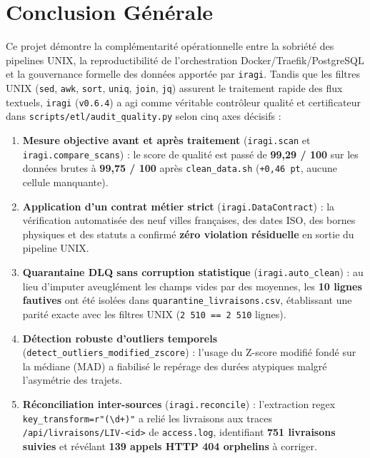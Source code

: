 \documentclass[11pt,a4paper]{article}
\begin{document}
\section{Conclusion G\'en\'erale}
Ce projet d\'emontre la compl\'ementarit\'e op\'erationnelle entre la sobri\'et\'e des pipelines UNIX, la reproductibilit\'e de l'orchestration Docker/Traefik/PostgreSQL et la gouvernance formelle des donn\'ees apport\'ee par \texttt{iragi}. Tandis que les filtres UNIX (\texttt{sed}, \texttt{awk}, \texttt{sort}, \texttt{uniq}, \texttt{join}, \texttt{jq}) assurent le traitement rapide des flux textuels, \texttt{iragi} (\texttt{v0.6.4}) a agi comme v\'eritable contr\^oleur qualit\'e et certificateur dans \texttt{scripts/etl/audit\_quality.py} selon cinq axes d\'ecisifs :
\begin{enumerate}
    \item \textbf{Mesure objective avant et apr\`es traitement} (\texttt{iragi.scan} et \texttt{iragi.compare\_scans}) : le score de qualit\'e est pass\'e de \textbf{99,29 / 100} sur les donn\'ees brutes \`a \textbf{99,75 / 100} apr\`es \texttt{clean\_data.sh} (\texttt{+0,46 pt}, aucune cellule manquante).
    \item \textbf{Application d'un contrat m\'etier strict} (\texttt{iragi.DataContract}) : la v\'erification automatis\'ee des neuf villes fran\c{c}aises, des dates ISO, des bornes physiques et des statuts a confirm\'e \textbf{z\'ero violation r\'esiduelle} en sortie du pipeline UNIX.
    \item \textbf{Quarantaine DLQ sans corruption statistique} (\texttt{iragi.auto\_clean}) : au lieu d'imputer aveugl\'ement les champs vides par des moyennes, les \textbf{10 lignes fautives} ont \'et\'e isol\'ees dans \texttt{quarantine\_livraisons.csv}, \'etablissant une parit\'e exacte avec les filtres UNIX (\texttt{2\,510 == 2\,510} lignes).
    \item \textbf{D\'etection robuste d'outliers temporels} (\texttt{detect\_outliers\_modified\_zscore}) : l'usage du Z-score modifi\'e fond\'e sur la m\'ediane (MAD) a fiabilis\'e le rep\'erage des dur\'ees atypiques malgr\'e l'asym\'etrie des trajets.
    \item \textbf{R\'econciliation inter-sources} (\texttt{iragi.reconcile}) : l'extraction regex \texttt{key\_transform=r"(\textbackslash d+)"} a reli\'e les livraisons aux traces \texttt{/api/livraisons/LIV-<id>} de \texttt{access.log}, identifiant \textbf{751 livraisons suivies} et rév\'elant \textbf{139 appels HTTP 404 orphelins} \`a corriger.
\end{enumerate}
\end{document}
